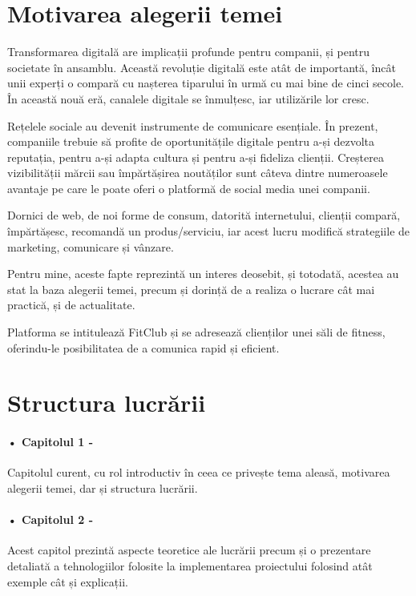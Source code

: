 \section{Motivarea alegerii temei}

Transformarea digitală are implicații profunde pentru companii, și pentru societate în ansamblu. Această revoluție digitală este atât de importantă, încât unii experți o compară cu nașterea tiparului în urmă cu mai bine de cinci secole. În această nouă eră, canalele digitale se înmulțesc, iar utilizările lor cresc.\newline
 
Rețelele sociale au devenit instrumente de comunicare esențiale. În prezent, companiile trebuie să profite de oportunitățile digitale pentru a-și dezvolta reputația, pentru a-și adapta cultura și pentru a-și fideliza clienții. Creșterea vizibilității mărcii sau împărtășirea noutăților sunt câteva dintre numeroasele avantaje pe care le poate oferi o platformă de social media unei companii.\newline
 
Dornici de web, de noi forme de consum, datorită internetului, clienții compară, împărtășesc, recomandă un produs/serviciu, iar acest lucru modifică strategiile de marketing, comunicare și vânzare.\newline

Pentru mine, aceste fapte reprezintă un interes deosebit, și totodată, acestea au stat la baza alegerii temei, precum și dorință de a realiza o lucrare cât mai practică, și de actualitate.\newline

Platforma se intitulează FitClub și se adresează clienților unei săli de fitness, oferindu-le posibilitatea de a comunica rapid și eficient.


\section{Structura lucrării}

\paragraph{•  Capitolul 1 -} Capitolul curent, cu rol introductiv în ceea ce privește tema aleasă, motivarea alegerii temei, dar și structura lucrării.

\paragraph{•  Capitolul 2 -} Acest capitol prezintă aspecte teoretice ale lucrării precum și o prezentare detaliată a tehnologiilor folosite la implementarea proiectului folosind  atât exemple cât și explicații.

\label{chap:01}


